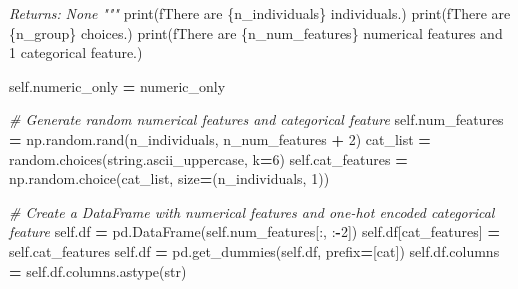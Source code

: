 \documentclass[
]{book}
\newenvironment{Shaded}{\begin{snugshade}}{\end{snugshade}}
\newcommand{\BuiltInTok}[1]{#1}
\newcommand{\CommentTok}[1]{\textcolor[rgb]{0.56,0.35,0.01}{\textit{#1}}}
\newcommand{\DecValTok}[1]{\textcolor[rgb]{0.00,0.00,0.81}{#1}}
\newcommand{\NormalTok}[1]{#1}
\newcommand{\OperatorTok}[1]{\textcolor[rgb]{0.81,0.36,0.00}{\textbf{#1}}}
\newcommand{\SpecialCharTok}[1]{\textcolor[rgb]{0.00,0.00,0.00}{#1}}
\newcommand{\SpecialStringTok}[1]{\textcolor[rgb]{0.31,0.60,0.02}{#1}}
\newcommand{\StringTok}[1]{\textcolor[rgb]{0.31,0.60,0.02}{#1}}
\newcommand{\VariableTok}[1]{\textcolor[rgb]{0.00,0.00,0.00}{#1}}
\theoremstyle{definition}
\theoremstyle{definition}
\theoremstyle{definition}
\theoremstyle{definition}
\theoremstyle{remark}
\begin{document}
\begin{Shaded}
\begin{Highlighting}[]
\CommentTok{        Returns:}
\CommentTok{            None}
\CommentTok{        """}
        \BuiltInTok{print}\NormalTok{(}\SpecialStringTok{f\textquotesingle{}There are }\SpecialCharTok{\{}\NormalTok{n\_individuals}\SpecialCharTok{\}}\SpecialStringTok{ individuals.\textquotesingle{}}\NormalTok{)}
        \BuiltInTok{print}\NormalTok{(}\SpecialStringTok{f\textquotesingle{}There are }\SpecialCharTok{\{}\NormalTok{n\_group}\SpecialCharTok{\}}\SpecialStringTok{ choices.\textquotesingle{}}\NormalTok{)}
        \BuiltInTok{print}\NormalTok{(}\SpecialStringTok{f\textquotesingle{}There are }\SpecialCharTok{\{}\NormalTok{n\_num\_features}\SpecialCharTok{\}}\SpecialStringTok{ numerical features and 1 categorical feature.\textquotesingle{}}\NormalTok{)}

        \VariableTok{self}\NormalTok{.numeric\_only }\OperatorTok{=}\NormalTok{ numeric\_only}

        \CommentTok{\# Generate random numerical features and categorical feature}
        \VariableTok{self}\NormalTok{.num\_features }\OperatorTok{=}\NormalTok{ np.random.rand(n\_individuals, n\_num\_features }\OperatorTok{+} \DecValTok{2}\NormalTok{)}
\NormalTok{        cat\_list }\OperatorTok{=}\NormalTok{ random.choices(string.ascii\_uppercase, k}\OperatorTok{=}\DecValTok{6}\NormalTok{)}
        \VariableTok{self}\NormalTok{.cat\_features }\OperatorTok{=}\NormalTok{ np.random.choice(cat\_list, size}\OperatorTok{=}\NormalTok{(n\_individuals, }\DecValTok{1}\NormalTok{))}

        \CommentTok{\# Create a DataFrame with numerical features and one{-}hot encoded categorical feature}
        \VariableTok{self}\NormalTok{.df }\OperatorTok{=}\NormalTok{ pd.DataFrame(}\VariableTok{self}\NormalTok{.num\_features[:, :}\OperatorTok{{-}}\DecValTok{2}\NormalTok{])}
        \VariableTok{self}\NormalTok{.df[}\StringTok{\textquotesingle{}cat\_features\textquotesingle{}}\NormalTok{] }\OperatorTok{=} \VariableTok{self}\NormalTok{.cat\_features}
        \VariableTok{self}\NormalTok{.df }\OperatorTok{=}\NormalTok{ pd.get\_dummies(}\VariableTok{self}\NormalTok{.df, prefix}\OperatorTok{=}\NormalTok{[}\StringTok{\textquotesingle{}cat\textquotesingle{}}\NormalTok{])}
        \VariableTok{self}\NormalTok{.df.columns }\OperatorTok{=} \VariableTok{self}\NormalTok{.df.columns.astype(}\BuiltInTok{str}\NormalTok{)}


\end{Highlighting}
\end{Shaded}
\end{document}
